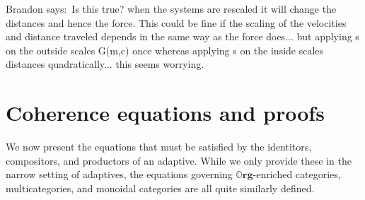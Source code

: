 \documentclass[11pt, one side, article]{memoir}
\theoremstyle{definition}
\theoremstyle{plain}
\newcommand{\Cat}[1]{\mathbf{#1}}%
\newcommand{\0}{\textsf{0}}
\newcommand{\1}{\tn{\textsf{1}}}
\newcommand{\org}{{\mathbb{O}\Cat{rg}}}
\newcommand{\bnote}[1]{{\color{red}Brandon says:}~#1.\quad{\color{red}$\lozenge$}}
\begin{document}
\bnote{Is this true? when the systems are rescaled it will change the distances and hence the force. This could be fine if the scaling of the velocities and distance traveled depends in the same way as the force does... but applying s on the outside scales G(m,c) once whereas applying s on the inside scales distances quadratically... this seems worrying}




\appendix
\chapter{Coherence equations and proofs}\label{coherenceproofs}


We now present the equations that must be satisfied by the identitors, compositors, and productors of an adaptive. While we only provide these in the narrow setting of adaptives, the equations governing $\org$-enriched categories, multicategories, and monoidal categories are all quite similarly defined.
\end{document}
